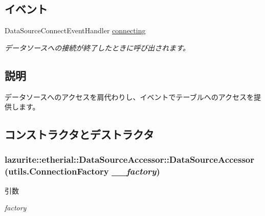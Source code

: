 \subsection*{イベント}
\begin{DoxyCompactItemize}
\item 
DataSourceConnectEventHandler \hyperlink{classlazurite_1_1etherial_1_1_data_source_accessor_a1cb69bb584776cd4924e15ef131ed5d9}{connecting}
\begin{DoxyCompactList}\small\item\em データソースへの接続が終了したときに呼び出されます。 \item\end{DoxyCompactList}\end{DoxyCompactItemize}


\subsection{説明}
データソースへのアクセスを肩代わりし、イベントでテーブルへのアクセスを提供します。 

\subsection{コンストラクタとデストラクタ}
\hypertarget{classlazurite_1_1etherial_1_1_data_source_accessor_aca529d0f5b23223c93c536897318b727}{
\subsubsection[{DataSourceAccessor}]{\setlength{\rightskip}{0pt plus 5cm}lazurite::etherial::DataSourceAccessor::DataSourceAccessor ({\bf utils.ConnectionFactory} {\em \_\-\_\-factory})}}
\label{classlazurite_1_1etherial_1_1_data_source_accessor_aca529d0f5b23223c93c536897318b727}

\begin{DoxyParams}{引数}
\item[{\em factory}]\end{DoxyParams}


